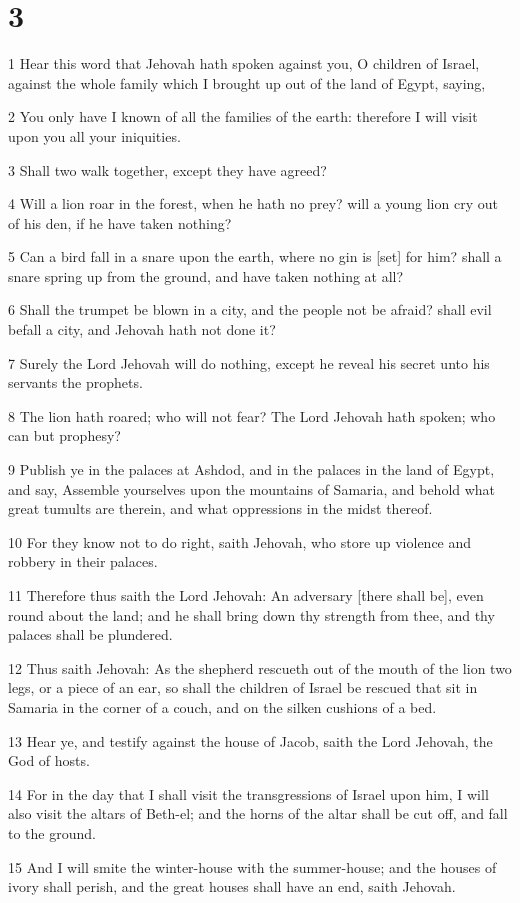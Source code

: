 \chapter{3}

\par 1 Hear this word that Jehovah hath spoken against you, O children of Israel, against the whole family which I brought up out of the land of Egypt, saying,
\par 2 You only have I known of all the families of the earth: therefore I will visit upon you all your iniquities.
\par 3 Shall two walk together, except they have agreed?
\par 4 Will a lion roar in the forest, when he hath no prey? will a young lion cry out of his den, if he have taken nothing?
\par 5 Can a bird fall in a snare upon the earth, where no gin is [set] for him? shall a snare spring up from the ground, and have taken nothing at all?
\par 6 Shall the trumpet be blown in a city, and the people not be afraid? shall evil befall a city, and Jehovah hath not done it?
\par 7 Surely the Lord Jehovah will do nothing, except he reveal his secret unto his servants the prophets.
\par 8 The lion hath roared; who will not fear? The Lord Jehovah hath spoken; who can but prophesy?
\par 9 Publish ye in the palaces at Ashdod, and in the palaces in the land of Egypt, and say, Assemble yourselves upon the mountains of Samaria, and behold what great tumults are therein, and what oppressions in the midst thereof.
\par 10 For they know not to do right, saith Jehovah, who store up violence and robbery in their palaces.
\par 11 Therefore thus saith the Lord Jehovah: An adversary [there shall be], even round about the land; and he shall bring down thy strength from thee, and thy palaces shall be plundered.
\par 12 Thus saith Jehovah: As the shepherd rescueth out of the mouth of the lion two legs, or a piece of an ear, so shall the children of Israel be rescued that sit in Samaria in the corner of a couch, and on the silken cushions of a bed.
\par 13 Hear ye, and testify against the house of Jacob, saith the Lord Jehovah, the God of hosts.
\par 14 For in the day that I shall visit the transgressions of Israel upon him, I will also visit the altars of Beth-el; and the horns of the altar shall be cut off, and fall to the ground.
\par 15 And I will smite the winter-house with the summer-house; and the houses of ivory shall perish, and the great houses shall have an end, saith Jehovah.

